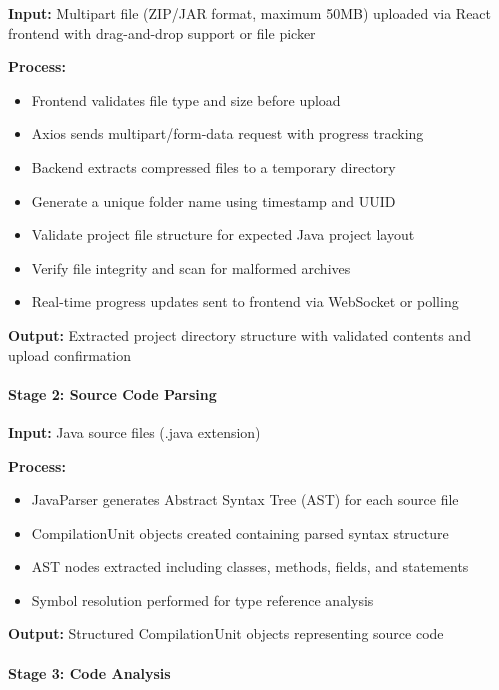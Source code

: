 \documentclass[12pt,a4paper]{article}
\begin{document}
    \textbf{Input:} Multipart file (ZIP/JAR format, maximum 50MB) uploaded via React frontend with drag-and-drop support or file picker

    \textbf{Process:}
    \begin{itemize}[leftmargin=0.5in]
        \item Frontend validates file type and size before upload
        \item Axios sends multipart/form-data request with progress tracking
        \item Backend extracts compressed files to a temporary directory
        \item Generate a unique folder name using timestamp and UUID
        \item Validate project file structure for expected Java project layout
        \item Verify file integrity and scan for malformed archives
        \item Real-time progress updates sent to frontend via WebSocket or polling
    \end{itemize}

    \textbf{Output:} Extracted project directory structure with validated contents and upload confirmation

    \paragraph{Stage 2: Source Code Parsing}

    \textbf{Input:} Java source files (.java extension)

    \textbf{Process:}
    \begin{itemize}[leftmargin=0.5in]
        \item JavaParser generates Abstract Syntax Tree (AST) for each source file
        \item CompilationUnit objects created containing parsed syntax structure
        \item AST nodes extracted including classes, methods, fields, and statements
        \item Symbol resolution performed for type reference analysis
    \end{itemize}

    \textbf{Output:} Structured CompilationUnit objects representing source code

    \paragraph{Stage 3: Code Analysis}
\end{document}
